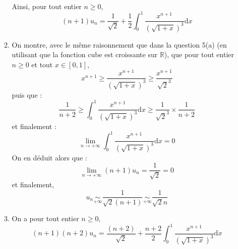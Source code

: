 \documentclass[a4paper,twoside,french,10pt]{VcCours}
\newcommand{\dx}{\text{d}x}
\begin{document}
\begin{enumerate}
\begin{enumerate}
\begin{align*}
  \end{align*}
  Ainsi, pour tout entier $n \geq 0$,
  $$ \boxed{(n+1) u_n = \dfrac{1}{\sqrt{2}} + \dfrac{1}{2} \int_0^1 \dfrac{x^{n+1}}{(\sqrt{1+x})^3} \dx}$$
  \item On montre, avec le même raisonnement que dans la question 5(a) (en utilisant que la fonction cube est croissante sur $\mathbb{R}$), que pour tout entier $n \geq 0$ et tout $x \in [0,1]$,
  $$ x^{n+1} \geq \dfrac{x^{n+1}}{(\sqrt{1+x})^3} \geq \dfrac{x^{n+1}}{\sqrt{2}^3}$$
  puis que :
  $$  \dfrac{1}{n+2} \geq \int_0^1 \dfrac{x^{n+1}}{(\sqrt{1+x})^3} \dx \geq \dfrac{1}{\sqrt{2}^3} \times \dfrac{1}{n+2}$$
  et finalement :
  $$ \lim_{n \rightarrow + \infty} \int_0^1 \dfrac{x^{n+1}}{(\sqrt{1+x})^3} \dx = 0$$
  On en déduit alors que :
  $$ \lim_{n \rightarrow + \infty} (n+1)u_n = \dfrac{1}{\sqrt{2}}=0$$
  et finalement,
  $$ \boxed{ u_n \underset{+ \infty}{\sim} \dfrac{1}{\sqrt{2}(n+1)} \underset{+ \infty}{\sim} \dfrac{1}{\sqrt{2}n} }$$
  \item On a pour tout entier $n \geq 0$,
  $$(n+1)(n+2) u_n = \dfrac{(n+2)}{\sqrt{2}} + \dfrac{n+2}{2} \int_0^1 \dfrac{x^{n+1}}{(\sqrt{1+x})^3} \dx$$
  

\end{enumerate}
\end{enumerate}
\end{document}

